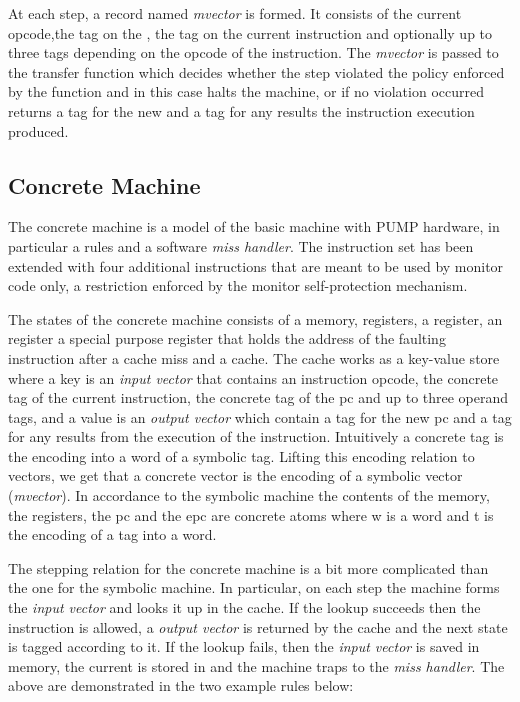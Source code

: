 At each step, a record named \emph{mvector} is formed. It consists of the 
current opcode,the tag on the \pc, the tag on the current instruction and 
optionally up to three tags depending on the opcode of the instruction.
The \emph{mvector} is passed to the transfer function
which decides whether the step violated the policy enforced by the \TRANSFER
function and in this case halts the machine, or if no violation occurred returns
a tag for the new \pc and a tag for any results the instruction execution 
produced.


\subsection{Concrete Machine}\label{sec:concrete}

The concrete machine is a model of the basic machine with PUMP hardware, 
in particular a rules \cache and a software \emph{miss handler}. 
The instruction set has been extended with four additional instructions that 
are meant to be used by monitor code only, a restriction enforced by the monitor
self-protection mechanism.

The states of the concrete machine consists of a memory, registers, a \pc 
register, an \epc register a special purpose register that holds the address of
the faulting instruction after a cache miss and a cache.
The cache works as a key-value store where a key is an \emph{input vector} that
contains an instruction opcode, the concrete tag of the current instruction,
the concrete tag of the pc and up to three operand tags, and a value is an 
\emph{output vector} which contain a tag for the new pc and a tag for any
results from the execution of the instruction. Intuitively a concrete tag is the
encoding into a word of a symbolic tag. 
Lifting this encoding relation to vectors, we get that a concrete vector is the
encoding of a symbolic vector (\emph{mvector}). 
In accordance  to the symbolic machine
the contents of the memory, the registers, the pc and the epc are concrete atoms
 where w is a word and t is the encoding of a tag into a word.

The stepping relation for the concrete machine is a bit more complicated than
the one for the symbolic machine. In particular, on each step the machine forms
the \emph{input vector} and looks it up in the cache. If the lookup succeeds 
then the instruction is allowed, a \emph{output vector} is returned by the
cache and the next state is tagged according to it. 
If the lookup fails, then the \emph{input vector} is saved in memory, the 
current \pc is stored in \epc and the machine traps to the \emph{miss handler}.
The above are demonstrated in the two example rules below:

